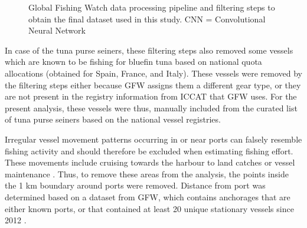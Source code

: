 \begin{figure}[htp]
\begin{center}
        \end{center}        
\caption{Global Fishing Watch data processing pipeline and filtering steps to obtain the final dataset used in this study. CNN = Convolutional Neural Network}
\label{fig:workflow}
\end{figure}

\medskip

In case of the tuna purse seiners, these filtering steps also removed some vessels which are known to be fishing for bluefin tuna based on 
national quota allocations (obtained for Spain, France, and Italy). These vessels were
removed by the filtering steps either because GFW assigns them a different gear type, or they are not present in the
registry information from ICCAT that GFW uses. For the present analysis, these vessels were thus, manually included from the
curated list of tuna purse seiners based on the national vessel registries.

\medskip

Irregular vessel movement patterns occurring in or near ports can falsely resemble fishing activity and should therefore be excluded when estimating fishing effort. 
These movements include cruising towards the harbour to land catches or vessel maintenance \citep{souza}. Thus,
to remove these areas from the analysis, the points inside the 1 km boundary around ports were removed. Distance from port was determined based on a dataset from 
GFW, which contains anchorages that are either known ports, or that contained at least 20 unique stationary vessels since 2012 \citep{gfw_distance}. 

